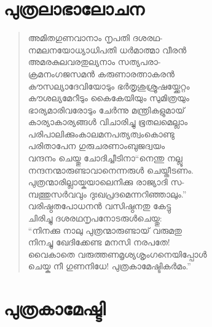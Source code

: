 \section{പുത്രലാഭാലോചന}

\begin{verse}
അമിതഗുണവാനാം നൃപതി ദശരഥ-\\
നമലനയോധ്യാധിപതി ധര്‍മാത്മാ വീരന്‍\\
അമരകുലവരതുല്യനാം സത്യപരാ-\\
ക്രമനംഗജസമന്‍ കരുണാരത്നാകരന്‍\\
കൗസല്യാദേവിയോടും ഭര്‍തൃശുശ്രൂഷയ്ക്കേറ്റം\\
കൗശല്യമേറീടും കൈകേയിയും സുമിത്രയും\\
ഭാര്യമാരിവരോടും ചേര്‍ന്നു മന്ത്രികളുമായ്\\
കാര്യാകാര്യങ്ങള്‍ വിചാരിച്ചു ഭൂതലമെല്ലാം\\
പരിപാലിക്കുംകാലമനപത്യത്വംകൊണ്ടു\\
പരിതാപേന ഗുരുചരണാംബുജദ്വയം\\
വന്ദനം ചെയ്തു ചോദിച്ചീടിനാ“നെന്തു നല്ലൂ\\
നന്ദനന്മാരുണ്ടാവാനെന്നരുള്‍ ചെയ്തീടണം.\\
പുത്രന്മാരില്ലായ്കയാലെനിക്കു രാജ്യാദി സ-\\
മ്പത്തുസര്‍വവും ദുഃഖപ്രദമെന്നറിഞ്ഞാലും.”\\
വരിഷ്ഠതപോധനന്‍ വസിഷ്ഠനതു കേട്ടു\\
ചിരിച്ചു ദശരഥനൃപനോടരുള്‍ചെയ്തു:\\
“നിനക്കു നാലു പുത്രന്മാരുണ്ടായ് വരുമതു\\
നിനച്ചു ഖേദിക്കേണ്ട മനസി നരപതേ!\\
വൈകാതെ വരുത്തണമൃശ്യശൃംഗനെയിപ്പോള്‍\\
ചെയ്ക നീ ഗുണനിധേ! പുത്രകാമേഷ്ടികര്‍മം.”
\end{verse}

\section{പുത്രകാമേഷ്ടി}

